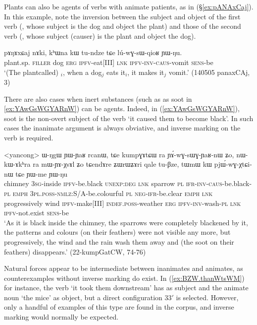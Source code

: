Plants can also be agents of verbs with animate patients, as in (§\ref{ex:pANAxCaj}). In this example, note the inversion between the subject and object of the first verb (, whose subject is the dog and object the plant) and those of the second verb (, whose subject (causer) is the plant and object the dog).

\begin{exe}
\ex \label{ex:pANAxCaj} 
\gll pɤŋɤxɕaj nɤki, kʰɯna kɯ tu-ndze tɕe lú-wɣ-sɯ-qioʁ ɲɯ-ŋu. \\
plant.sp. \textsc{filler} dog \textsc{erg} \textsc{ipfv}-eat[III] \textsc{lnk} \textsc{ipfv}-\textsc{inv}-\textsc{caus}-vomit \textsc{sens}-be \\
\glt `(The plantcalled) $_i$, when a dog$_j$ eats it$_i$, it makes it$_j$ vomit.' (140505 panaxCAj, 3)
\end{exe}

There are also cases when inert substances (such as as soot in \ref{ex:YAwGsWGYARnW}) can be agents. Indeed, in (\ref{ex:YAwGsWGYARnW}), soot is the non-overt subject of the verb   `it caused them to become black'. In such cases the inanimate argument is always obviative, and inverse marking on the verb is required.

\begin{exe}
\ex \label{ex:YAwGsWGYARnW} 
\gll <yancong> ɯ-ŋgɯ ɲɯ-ɲaʁ rcanɯ, tɕe kumpɣɤtɕɯ ra ɲɤ́-wɣ-sɯɣ-ɲaʁ-nɯ ʑo, nɯ-kɯ-ɤkʰra ra mɯ-ɲɤ-χsɤl ʑo tɕendɤre ʑɯrɯʑɤri qale tu-βze, tɯmɯ kɯ pjɯ́-wɣ-χtɕi-nɯ tɕe ɲɯ-me ɲɯ-ŋu \\
chimney \textsc{3sg}-inside \textsc{ipfv}-be.black \textsc{unexp}:\textsc{deg} \textsc{lnk} sparrow \textsc{pl} \textsc{ifr}-\textsc{inv}-\textsc{caus}-be.black-\textsc{pl} \textsc{emph} \textsc{3pl}.\textsc{poss}-\textsc{nmlz}:S/A-be.colourful \textsc{pl} \textsc{neg}-\textsc{ifr}-be.clear \textsc{emph} \textsc{lnk} progressively wind \textsc{ipfv}-make[III] \textsc{indef}.\textsc{poss}-weather \textsc{erg} \textsc{ipfv}-\textsc{inv}-wash-\textsc{pl} \textsc{lnk} \textsc{ipfv}-not.exist \textsc{sens}-be \\
\glt `As it is black inside the chimney, the sparrows were completely blackened by it, the patterns and colours (on their feathers) were not visible any more, but progressively, the wind and the rain wash them away and (the soot on their feathers) disappears.'
 (22-kumpGatCW, 74-76)
\end{exe}

Natural forces appear to be intermediate between inanimates and animates, as counterexamples without inverse marking do exist. In (\ref{ex:BZW.thanWtsWM}) for instance, the verb  `it took them downstream' has  as subject and the animate noun  `the mice' as object, but a direct configuration 3\fl{}3$'$ is selected. However, only a handful of examples of this type are found in the corpus, and inverse marking would normally be expected.

